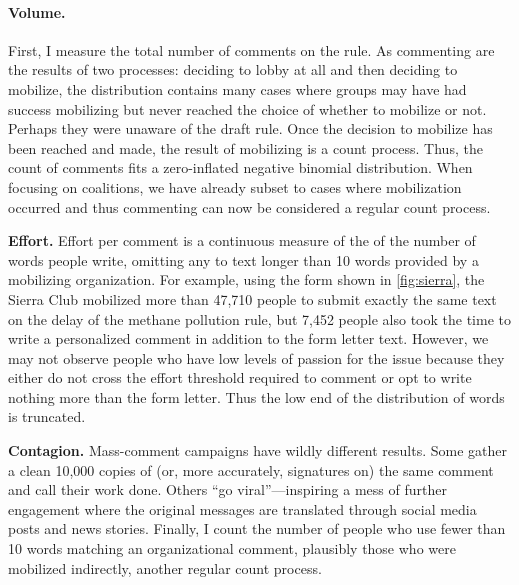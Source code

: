 \paragraph{Volume.} 
First, I measure the total number of comments on the rule. As commenting are the results of two processes: deciding to lobby at all and then deciding to mobilize, the distribution contains many cases where groups may have had success mobilizing but never reached the choice of whether to mobilize or not. Perhaps they were unaware of the draft rule. Once the decision to mobilize has been reached and made, the result of mobilizing is a count process. Thus, the count of comments fits a zero-inflated negative binomial distribution. When focusing on coalitions, we have already subset to cases where mobilization occurred and thus commenting can now be considered a regular count process. 

\textbf{Effort.} Effort per comment is a continuous measure of the of the number of words people write, omitting any to text longer than 10 words provided by a mobilizing organization. %
For example, using the form shown in \ref{fig:sierra}, the Sierra Club mobilized more than 47,710 people to submit exactly the same text on the delay of the methane pollution rule, but 7,452 people also took the time to write a personalized comment in addition to the form letter text. However, we may not observe people who have low levels of passion for the issue because they either do not cross the effort threshold required to comment or opt to write nothing more than the form letter. Thus the low end of the distribution of words is truncated.

\textbf{Contagion.} Mass-comment campaigns have wildly different results. Some gather a clean 10,000 copies of (or, more accurately, signatures on) the same comment and call their work done. Others ``go viral''---inspiring a mess of further engagement where the original messages are translated through social media posts and news stories.
Finally, I count the number of people who use fewer than 10 words matching an organizational comment, plausibly those who were mobilized indirectly, another regular count process.


